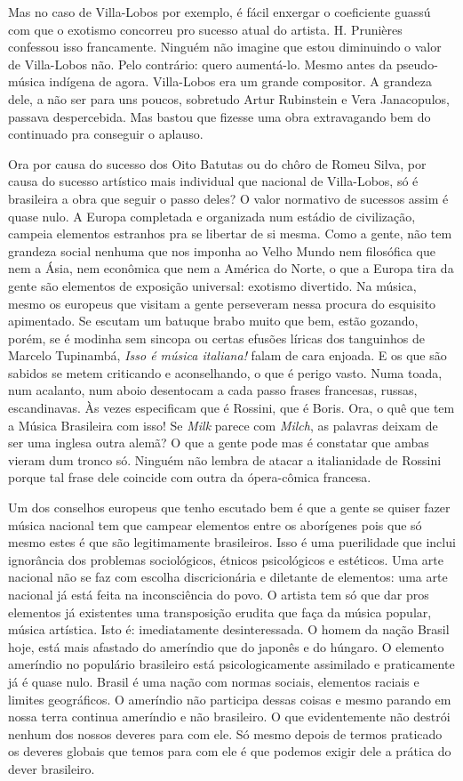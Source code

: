Mas no caso de Villa-Lobos por exemplo, é fácil enxergar o coeficiente
guassú com que o exotismo concorreu pro sucesso atual do artista. H.
Prunières confessou isso francamente. Ninguém não imagine que estou
diminuindo o valor de Villa-Lobos não. Pelo contrário: quero aumentá-lo.
Mesmo antes da pseudo-música indígena de agora. Villa-Lobos era um
grande compositor. A grandeza dele, a não ser para uns poucos, sobretudo
Artur Rubinstein e Vera Janacopulos, passava despercebida. Mas bastou
que fizesse uma obra extravagando bem do continuado pra conseguir o
aplauso.~

Ora por causa do sucesso dos Oito Batutas ou do chôro de Romeu Silva,
por causa do sucesso artístico mais individual que nacional de
Villa-Lobos, só é brasileira a obra que seguir o passo deles? O valor
normativo de sucessos assim é quase nulo. A Europa completada e
organizada num estádio de civilização, campeia elementos estranhos pra
se libertar de si mesma. Como a gente, não tem grandeza social nenhuma
que nos imponha ao Velho Mundo nem filosófica que nem a Ásia, nem
econômica que nem a América do Norte, o que a Europa tira da gente são
elementos de exposição universal: exotismo divertido. Na música, mesmo
os europeus que visitam a gente perseveram nessa procura do esquisito
apimentado. Se escutam um batuque brabo muito que bem, estão gozando,
porém, se é modinha sem sincopa ou certas efusões líricas dos tanguinhos
de Marcelo Tupinambá, \emph{Isso é música italiana!} falam de cara
enjoada. E os que são sabidos se metem criticando e aconselhando, o que
é perigo vasto. Numa toada, num acalanto, num aboio desentocam a cada
passo frases francesas, russas, escandinavas. Às vezes especificam que é
Rossini, que é Boris. Ora, o quê que tem a Música Brasileira com isso!
Se \emph{Milk} parece com \emph{Milch}, as palavras deixam de ser uma
inglesa outra alemã? O que a gente pode mas é constatar que ambas vieram
dum tronco só. Ninguém não lembra de atacar a italianidade de Rossini
porque tal frase dele coincide com outra da ópera-cômica francesa.

Um dos conselhos europeus que tenho escutado bem é que a gente se quiser
fazer música nacional tem que campear elementos entre os aborígenes pois
que só mesmo estes é que são legitimamente brasileiros. Isso é uma
puerilidade que inclui ignorância dos problemas sociológicos, étnicos
psicológicos e estéticos. Uma arte nacional não se faz com escolha
discricionária e diletante de elementos: uma arte nacional já está feita
na inconsciência do povo. O artista tem só que dar pros elementos já
existentes uma transposição erudita que faça da música popular, música
artística. Isto é: imediatamente desinteressada. O homem da nação Brasil
hoje, está mais afastado do ameríndio que do japonês e do húngaro. O
elemento ameríndio no populário brasileiro está psicologicamente
assimilado e praticamente já é quase nulo. Brasil é uma nação com normas
sociais, elementos raciais e limites geográficos. O ameríndio não
participa dessas coisas e mesmo parando em nossa terra continua
ameríndio e não brasileiro. O que evidentemente não destrói nenhum dos
nossos deveres para com ele. Só mesmo depois de termos praticado os
deveres globais que temos para com ele é que podemos exigir dele a
prática do dever brasileiro.

